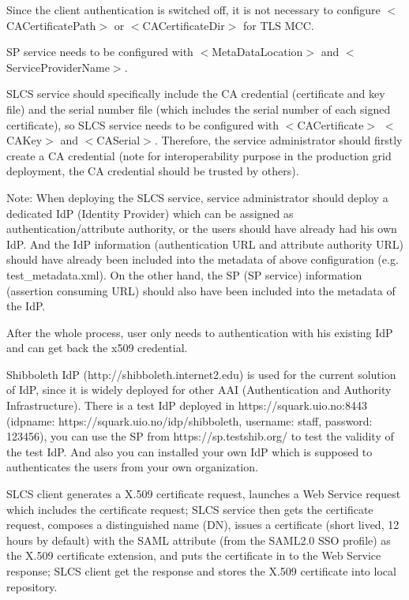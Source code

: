 \documentclass{article}                            %
\begin{document}
    Since the client authentication is switched off, it is not necessary to configure $<$CACertificatePath$>$ or $<$CACertificateDir$>$ for TLS MCC.

    SP service needs to be configured with $<$MetaDataLocation$>$ and $<$ServiceProviderName$>$. 

    SLCS service should specifically include the CA credential (certificate and key file) and the serial number file (which includes the serial number of each signed certificate), so SLCS service needs to be configured with $<$CACertificate$>$ $<$CAKey$>$ and $<$CASerial$>$. Therefore, the service administrator should firstly create a CA credential (note for interoperability purpose in the production grid deployment, the CA credential should be trusted by others). 

Note: When deploying the SLCS service, service administrator should deploy a dedicated IdP (Identity Provider) which can be assigned as authentication/attribute authority, or the users should have already had his own IdP. And the IdP information (authentication URL and attribute authority URL) should have already been included into the metadata of above configuration (e.g. test\_metadata.xml). On the other hand, the SP (SP service) information (assertion consuming URL) should also have been included into the metadata of the IdP.

    After the whole process, user only needs to authentication with his existing IdP and can get back the x509 credential.

    Shibboleth IdP (http://shibboleth.internet2.edu) is used for the current solution of IdP, since it is widely deployed for other AAI (Authentication and Authority Infrastructure). There is a test IdP deployed in https://squark.uio.no:8443 (idpname: https://squark.uio.no/idp/shibboleth, username: staff, password: 123456), you can use the SP from https://sp.testshib.org/ to test the validity of the test IdP. And also you can installed your own IdP which is supposed to authenticates the users from your own organization. 

    SLCS client generates  a X.509 certificate  request, launches a Web Service request which includes the certificate request; SLCS service then gets the certificate request, composes a distinguished name (DN), issues a certificate (short lived, 12 hours by default) with the SAML attribute (from the SAML2.0 SSO profile) as the X.509 certificate extension, and puts the certificate in to the Web Service response; SLCS client get the response and stores the X.509 certificate into local repository.
\end{document}
